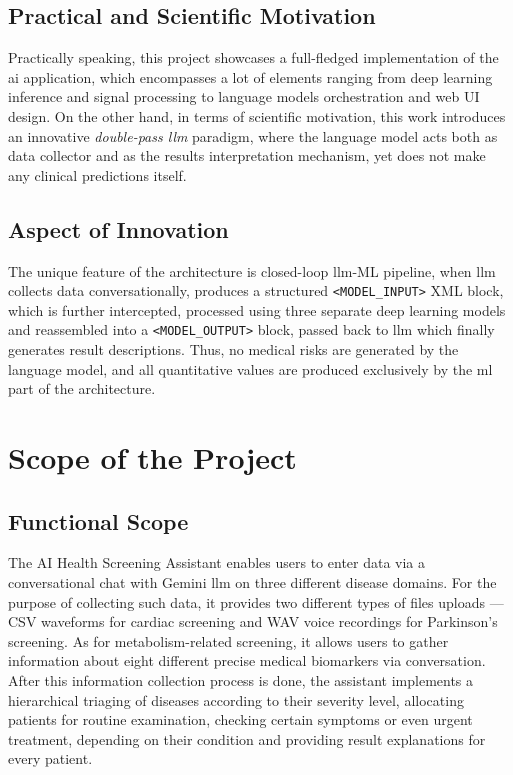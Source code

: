 \subsection{Practical and Scientific Motivation}

Practically speaking, this project showcases a full-fledged implementation of the \ac{ai} application, which encompasses a lot of elements ranging from deep learning inference and signal processing to language models orchestration and web UI design. On the other hand, in terms of scientific motivation, this work introduces an innovative \textit{double-pass \ac{llm}} paradigm, where the language model acts both as data collector and as the results interpretation mechanism, yet does not make any clinical predictions itself.

\subsection{Aspect of Innovation}

The unique feature of the architecture is closed-loop \ac{llm}-ML pipeline, when \ac{llm} collects data conversationally, produces a structured \texttt{<MODEL\_INPUT>} XML block, which is further intercepted, processed using three separate deep learning models and reassembled into a \texttt{<MODEL\_OUTPUT>} block, passed back to \ac{llm} which finally generates result descriptions. Thus, no medical risks are generated by the language model, and all quantitative values are produced exclusively by the \ac{ml} part of the architecture.

\section{Scope of the Project}

\subsection{Functional Scope}

The AI Health Screening Assistant enables users to enter data via a conversational chat with Gemini \ac{llm} on three different disease domains. For the purpose of collecting such data, it provides two different types of files uploads --- CSV waveforms for cardiac screening and WAV voice recordings for Parkinson's screening. As for metabolism-related screening, it allows users to gather information about eight different precise medical biomarkers via conversation. After this information collection process is done, the assistant implements a hierarchical triaging of diseases according to their severity level, allocating patients for routine examination, checking certain symptoms or even urgent treatment, depending on their condition and providing result explanations for every patient.

